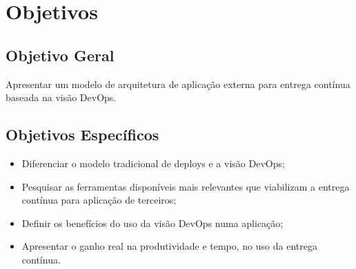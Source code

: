 \section{Objetivos}
\subsection{Objetivo Geral }
Apresentar um modelo de arquitetura de aplicação externa para entrega contínua baseada na visão DevOps.

\begin{comment}
Este é um comentário
\end{comment}

\subsection{Objetivos Específicos}
\begin{itemize}
	
\item Diferenciar o modelo tradicional de deploys e a visão DevOps;

\item Pesquisar as ferramentas disponíveis mais relevantes que viabilizam a entrega contínua para aplicação de terceiros;

\item Definir os benefícios do uso da visão DevOps numa aplicação;

\item Apresentar o ganho real na produtividade e tempo, no uso da entrega contínua.

\end{itemize}
